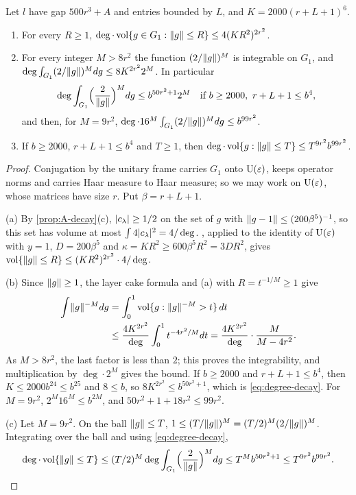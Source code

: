 \begin{lemma}\label{lem:degree-decay}
Let $l$ have gap $500r^3+A$ and entries bounded by $L$, and $K=2000(r+L+1)^6$.
\begin{enumerate}[label=\textup{(\alph*)}]
\item For every $R\ge1$, $\deg\cdot\operatorname{vol}\{g\in G_1:\lVert g\rVert\le R\}\le4(KR^2)^{2r^2}$.
\item For every integer $M>8r^2$ the function $(2/\lVert g\rVert)^M$ is integrable on $G_1$, and $\deg\int_{G_1}(2/\lVert g\rVert)^Mdg\le8K^{2r^2}2^M$. In particular
\begin{equation}\label{eq:degree-decay}
  \deg\int_{G_1}\Bigl(\frac2{\lVert g\rVert}\Bigr)^Mdg\le b^{50r^2+1}2^M\quad\text{if }b\ge2000,\ r+L+1\le b^4,
\end{equation}
and then, for $M=9r^2$, $\deg\cdot16^M\int_{G_1}(2/\lVert g\rVert)^Mdg\le b^{99r^2}$.
\item If $b\ge2000$, $r+L+1\le b^4$ and $T\ge1$, then $\deg\cdot\operatorname{vol}\{g:\lVert g\rVert\le T\}\le T^{9r^2}b^{99r^2}$.
\end{enumerate}
\end{lemma}

\begin{proof}
Conjugation by the unitary frame carries $G_1$ onto $\operatorname{U}(\varepsilon)$, keeps operator norms and carries Haar measure to Haar measure; so we may work on $\operatorname{U}(\varepsilon)$, whose matrices have size $r$. Put $\beta=r+L+1$.

(a) By \cref{prop:A-decay}(c), $\lvert c_\lambda\rvert\ge1/2$ on the set of $g$ with $\lVert g-1\rVert\le(200\beta^5)^{-1}$, so this set has volume at most $\int4\lvert c_\lambda\rvert^2=4/\deg$. , applied to the identity of $\operatorname{U}(\varepsilon)$ with
$y=1$, $D=200\beta^5$ and $\kappa=KR^2\ge600\beta^5R^2=3DR^2$, gives $\operatorname{vol}\{\lVert g\rVert\le R\}\le(KR^2)^{2r^2}\cdot4/\deg$.

(b) Since $\lVert g\rVert\ge1$, the layer cake formula and (a) with $R=t^{-1/M}\ge1$ give
\begin{align*}
  \int\lVert g\rVert^{-M}dg&=\int_0^1\operatorname{vol}\{g:\lVert g\rVert^{-M}>t\}\,dt\\
  &\le\frac{4K^{2r^2}}\deg\int_0^1t^{-4r^2/M}dt=\frac{4K^{2r^2}}\deg\cdot\frac M{M-4r^2}.
\end{align*}
As $M>8r^2$, the last factor is less than $2$; this proves the integrability, and multiplication by $\deg\cdot2^M$ gives the bound. If $b\ge2000$ and $r+L+1\le b^4$, then $K\le2000b^{24}\le b^{25}$ and $8\le b$, so
$8K^{2r^2}\le b^{50r^2+1}$, which is \eqref{eq:degree-decay}. For $M=9r^2$, $2^M16^M\le b^{2M}$, and $50r^2+1+18r^2\le99r^2$.

(c) Let $M=9r^2$. On the ball $\lVert g\rVert\le T$, $1\le(T/\lVert g\rVert)^M=(T/2)^M(2/\lVert g\rVert)^M$. Integrating over the ball and using \eqref{eq:degree-decay},
\[
  \deg\cdot\operatorname{vol}\{\lVert g\rVert\le T\}\le(T/2)^M\deg\int_{G_1}\Bigl(\frac2{\lVert g\rVert}\Bigr)^Mdg\le T^Mb^{50r^2+1}\le T^{9r^2}b^{99r^2}.\qedhere
\]
\end{proof}

